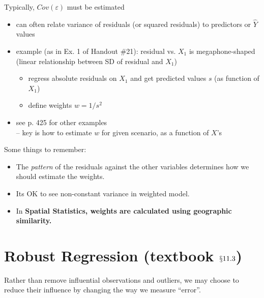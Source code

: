 \documentclass[12pt]{notes}
\begin{document}


\begin{minipage}[l][2cm][c]{\textwidth}
\begin{comment}
\end{comment}
\end{minipage}

Typically, $Cov(\varepsilon)$ must be estimated
\begin{itemize}
  \item can often relate variance of residuals (or squared residuals) to predictors or $\hat{Y}$ values
  \item example (as in Ex. 1 of Handout \#21): residual vs. $X_1$ is megaphone-shaped\\
       (linear relationship between SD of residual and $X_1$)
        \begin{itemize}
          \item regress absolute residuals on $X_1$ and get predicted values $s$ (as function of $X_1$)
          \item define weights $w = 1/s^2$
        \end{itemize}
  \item see p. 425 for other examples\\ -- key is how to estimate $w$ for given scenario, as a function of $X$'s
\end{itemize}

\nspace
Some things to remember:
\begin{itemize}
\item The \textit{pattern} of the residuals against the other variables determines how we should estimate the weights.
\item Its OK to see non-constant variance in weighted model. 
\item In \textbf{Spatial Statistics, weights are calculated using geographic similarity.}
\end{itemize}


\section{Robust Regression (textbook $\mathsection{11.3}$)}
Rather than remove influential observations and outliers, we may choose to reduce their influence by changing the way we measure ``error''.
\end{document}
